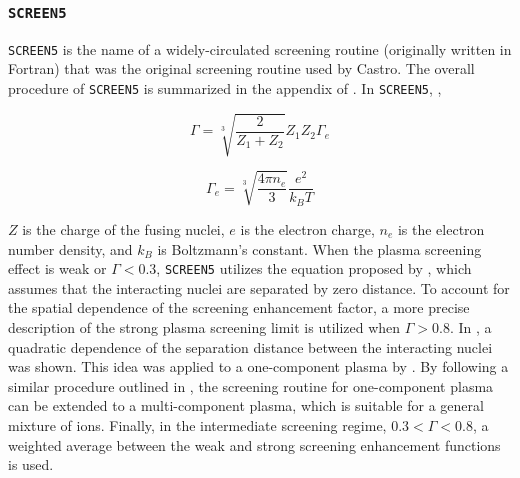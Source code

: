 \documentclass[preprint,times,tighten,linenumbers,trackchanges]{aastex631}
\newcommand{\castro}{{\sf Castro}}
\begin{document}


\subsubsection{{\tt SCREEN5}}

{\tt SCREEN5} is the name of a widely-circulated screening routine (originally written in Fortran) that was the original screening routine used by \castro.
The overall procedure of {\tt SCREEN5} is summarized in the appendix of \cite{Wallace:1982}. In {\tt SCREEN5}, , 

\begin{equation}\label{Eq:gamma_eq}
    \Gamma = \sqrt[3]{\frac{2}{Z_1+Z_2}}Z_1 Z_2 \Gamma_e
\end{equation}


\begin{equation}\label{Eq:gamma_e_eq}
    \Gamma_e = \sqrt[3]{\frac{4\pi n_e}{3}}\frac{e^2}{k_BT}
\end{equation}

 $Z$ is the charge of the fusing nuclei,  $e$ is the electron charge, $n_e$ is the electron number density, and $k_B$ is Boltzmann's constant. When the plasma screening effect is weak or $\Gamma < 0.3$, {\tt SCREEN5} utilizes the equation proposed by \cite{Graboske_1973, Dewitt_1973}, which assumes that the interacting nuclei are separated by zero distance. To account for the spatial dependence of the screening enhancement factor, a more precise description of the strong plasma screening limit is utilized when $\Gamma > 0.8$. In \cite{jancovici:1977}, a quadratic dependence of the separation distance between the interacting nuclei was shown. This idea was applied to a one-component plasma by \cite{alastuey:1978}. By following a similar procedure outlined in \cite{itoh:1979}, the screening routine for one-component plasma can be extended to a multi-component plasma, which is suitable for a general mixture of ions. Finally, in
the intermediate screening regime, $0.3 < \Gamma < 0.8$, a weighted average between the weak and strong screening enhancement functions is used.
\end{document}
